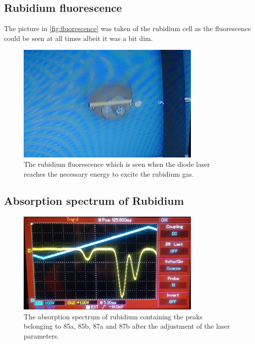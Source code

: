 \subsection{Rubidium fluorescence}
The picture in \autoref{fig:fluorescence} was taken of the rubidium cell as the fluorescence could be seen at all times albeit it was a bit dim.
\begin{figure}[ht]
    \center
    \includegraphics[width=0.8\textwidth]{bilder/fluorescence.jpg}
    \caption{The rubidium fluorescence which is seen when the diode laser reaches the necessary energy to excite the rubidium gas. \cite{anleitungHeNe}}
    \label{fig:fluorescence}
\end{figure}

\FloatBarrier

\subsection{Absorption spectrum of Rubidium}

\begin{figure}[ht]
    \center
    \includegraphics[width=0.8\textwidth]{bilder/spectrum.jpg}
    \caption{The absorption spectrum of rubidium containing the peaks belonging to 85a, 85b, 87a and 87b after the adjustment of the laser parameters. \cite{anleitungHeNe}}
    \label{fig:spectrum}
\end{figure}

\FloatBarrier